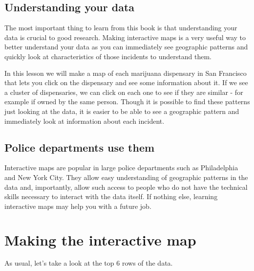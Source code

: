 \documentclass[
]{krantz}
\begin{document}
\hypertarget{understanding-your-data}{%
\subsection{Understanding your
data}\label{understanding-your-data}}

The most important thing to learn from this book is that
understanding your data is crucial to good research. Making
interactive maps is a very useful way to better understand
your data as you can immediately see geographic patterns and
quickly look at characteristics of those incidents to
understand them.

In this lesson we will make a map of each marijuana
dispensary in San Francisco that lets you click on the
dispensary and see some information about it. If we see a
cluster of dispensaries, we can click on each one to see if
they are similar - for example if owned by the same person.
Though it is possible to find these patterns just looking at
the data, it is easier to be able to see a geographic
pattern and immediately look at information about each
incident.

\hypertarget{police-departments-use-them}{%
\subsection{Police departments use
them}\label{police-departments-use-them}}

Interactive maps are popular in large police departments
such as Philadelphia and New York City. They allow easy
understanding of geographic patterns in the data and,
importantly, allow such access to people who do not have the
technical skills necessary to interact with the data itself.
If nothing else, learning interactive maps may help you with
a future job.

\hypertarget{making-the-interactive-map}{%
\section{Making the interactive
map}\label{making-the-interactive-map}}

As usual, let's take a look at the top 6 rows of the data.
\end{document}
